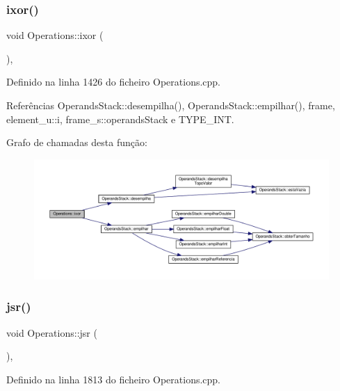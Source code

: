 \subsubsection{\texorpdfstring{ixor()}{ixor()}}
{\footnotesize\ttfamily void Operations\+::ixor (\begin{DoxyParamCaption}{ }\end{DoxyParamCaption})\hspace{0.3cm}{\ttfamily [static]}, {\ttfamily [private]}}



Definido na linha 1426 do ficheiro Operations.\+cpp.



Referências Operands\+Stack\+::desempilha(), Operands\+Stack\+::empilhar(), frame, element\+\_\+u\+::i, frame\+\_\+s\+::operands\+Stack e T\+Y\+P\+E\+\_\+\+I\+NT.

Grafo de chamadas desta função\+:\nopagebreak
\begin{figure}[H]
\begin{center}
\leavevmode
\includegraphics[width=350pt]{classOperations_abd0ce3453623b677de3af1f05bcf4b0b_cgraph}
\end{center}
\end{figure}
\mbox{\label{classOperations_a63c3ab8fef60a8a19ee336cb3d86f9aa}} 
\subsubsection{\texorpdfstring{jsr()}{jsr()}}
{\footnotesize\ttfamily void Operations\+::jsr (\begin{DoxyParamCaption}{ }\end{DoxyParamCaption})\hspace{0.3cm}{\ttfamily [static]}, {\ttfamily [private]}}



Definido na linha 1813 do ficheiro Operations.\+cpp.



